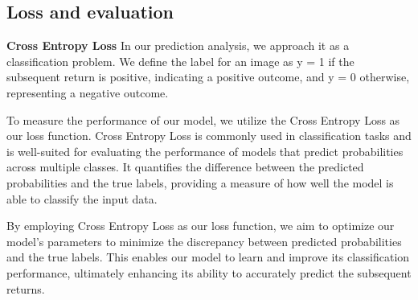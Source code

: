 \documentclass{article}
\begin{document}
\subsection{Loss and evaluation}
\textbullet \textbf{Cross Entropy Loss}
In our prediction analysis, we approach it as a classification problem. We define the label for an image as y = 1 if the subsequent return is positive, indicating a positive outcome, and y = 0 otherwise, representing a negative outcome.

To measure the performance of our model, we utilize the Cross Entropy Loss as our loss function. Cross Entropy Loss is commonly used in classification tasks and is well-suited for evaluating the performance of models that predict probabilities across multiple classes. It quantifies the difference between the predicted probabilities and the true labels, providing a measure of how well the model is able to classify the input data.

By employing Cross Entropy Loss as our loss function, we aim to optimize our model's parameters to minimize the discrepancy between predicted probabilities and the true labels. This enables our model to learn and improve its classification performance, ultimately enhancing its ability to accurately predict the subsequent returns.
\end{document}
